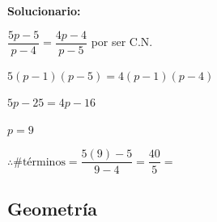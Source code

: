 \begin{enumerate}[resume]
	\vspace{2mm}
	\textbf{Solucionario:}
	
	$\dfrac{5p-5}{p-4} = \dfrac{4p-4}{p-5}$ por ser C.N.
	
	$5(p-1)(p-5) = 4(p-1)(p-4)$ 
	
	$5p - 25 = 4p - 16$ 
	
	$p = 9$ 
	
	$\therefore \# \text{términos} = \dfrac{5(9)-5}{9-4} = \dfrac{40}{5} =$
	
	\vspace{6mm}
	
\end{enumerate}



\subsection*{Geometría}

